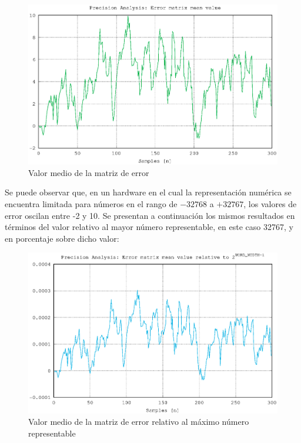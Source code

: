 \begin{figure}[h!]
    \centering
        \includegraphics[width = 12 cm]{./figures/C05-precision_2}
        \caption{Valor medio de la matriz de error}
        \label{fig:precision_2}
\end{figure}

Se puede observar que, en un hardware en el cual la representación numérica se encuentra limitada para números en el rango de $-32768$ a $+32767$, los valores de error oscilan entre -2 y 10. Se presentan a continuación los mismos resultados en términos del valor relativo al mayor número representable, en este caso 32767, y en porcentaje sobre dicho valor:

\begin{figure}[h!]
    \centering
        \includegraphics[width = 12 cm]{./figures/C05-precision_3}
        \caption{Valor medio de la matriz de error relativo al máximo número representable}
        \label{fig:precision_3}
\end{figure}

